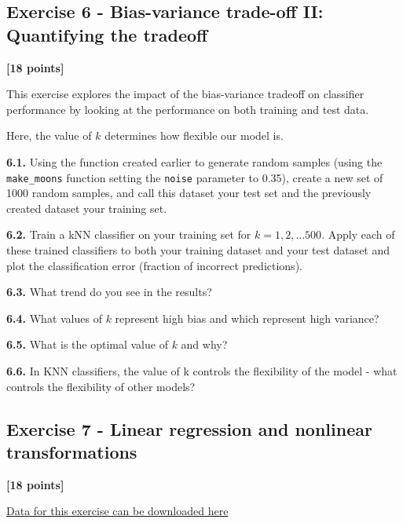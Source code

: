 \documentclass[
  letterpaper,
  DIV=11,
  numbers=noendperiod]{scrartcl}
\begin{document}
\subsection{Exercise 6 - Bias-variance trade-off II: Quantifying the
tradeoff}\label{exercise-6---bias-variance-trade-off-ii-quantifying-the-tradeoff}

\textbf{{[}18 points{]}}

This exercise explores the impact of the bias-variance tradeoff on
classifier performance by looking at the performance on both training
and test data.

Here, the value of \(k\) determines how flexible our model is.

\textbf{6.1.} Using the function created earlier to generate random
samples (using the \texttt{make\_moons} function setting the
\texttt{noise} parameter to 0.35), create a new set of 1000 random
samples, and call this dataset your test set and the previously created
dataset your training set.

\textbf{6.2.} Train a kNN classifier on your training set for
\(k = 1,2,...500\). Apply each of these trained classifiers to both your
training dataset and your test dataset and plot the classification error
(fraction of incorrect predictions).

\textbf{6.3.} What trend do you see in the results?

\textbf{6.4.} What values of \(k\) represent high bias and which
represent high variance?

\textbf{6.5.} What is the optimal value of \(k\) and why?

\textbf{6.6.} In KNN classifiers, the value of k controls the
flexibility of the model - what controls the flexibility of other
models?

\subsection{Exercise 7 - Linear regression and nonlinear
transformations}\label{exercise-7---linear-regression-and-nonlinear-transformations}

\textbf{{[}18 points{]}}

\begin{tcolorbox}[enhanced jigsaw, coltitle=black, title=\textcolor{quarto-callout-note-color}{\faInfo}\hspace{0.5em}{Note}, opacitybacktitle=0.6, bottomtitle=1mm, bottomrule=.15mm, opacityback=0, breakable, rightrule=.15mm, colback=white, colframe=quarto-callout-note-color-frame, colbacktitle=quarto-callout-note-color!10!white, titlerule=0mm, toprule=.15mm, toptitle=1mm, arc=.35mm, leftrule=.75mm, left=2mm]

\href{https://github.com/kylebradbury/ids705/tree/main/notebooks/data/a2}{Data
for this exercise can be downloaded here}

\end{tcolorbox}
\end{document}
